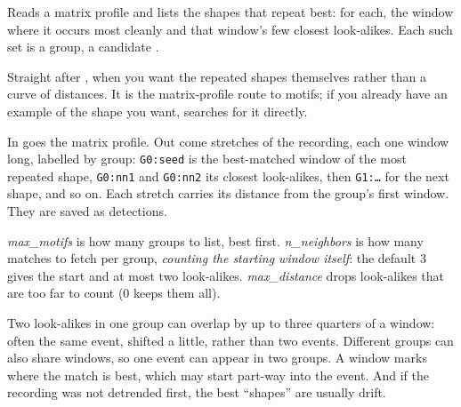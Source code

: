 Reads a matrix profile and lists the shapes that repeat best: for each, the window where it
occurs most cleanly and that window's few closest look-alikes. Each such set is a group, a
candidate .

Straight after , when you want the repeated shapes themselves
rather than a curve of distances. It is the matrix-profile route to motifs; if you already have an
example of the shape you want,  searches for it directly.

In goes the matrix profile. Out come stretches of the recording, each one window long, labelled
by group: \texttt{G0:seed} is the best-matched window of the most repeated shape, \texttt{G0:nn1}
and \texttt{G0:nn2} its closest look-alikes, then \texttt{G1:\dots} for the next shape, and so on.
Each stretch carries its distance from the group's first window. They are saved as detections.

\emph{max\_motifs} is how many groups to list, best first. \emph{n\_neighbors} is how many matches
to fetch per group, \emph{counting the starting window itself}: the default 3 gives the start and
at most two look-alikes. \emph{max\_distance} drops look-alikes that are too far to count (0 keeps
them all).

Two look-alikes in one group can overlap by up to three quarters of a window: often the same event,
shifted a little, rather than two events. Different groups can also share windows, so one event
can appear in two groups. A window marks where the match is best, which may start part-way into
the event. And if the recording was not detrended first, the best ``shapes'' are usually drift.
